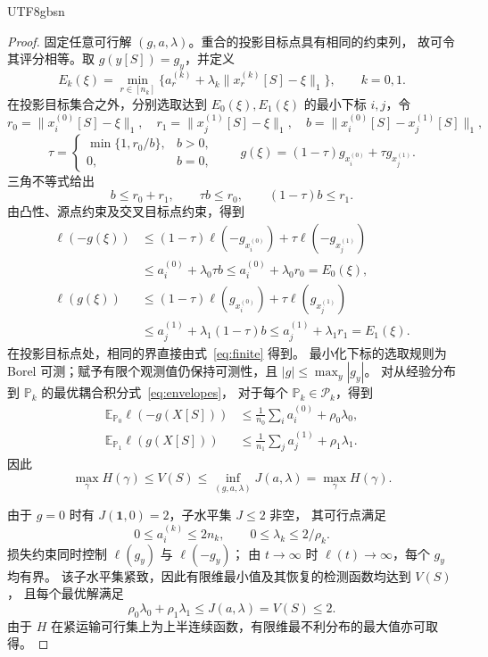 \documentclass[11pt,a4paper]{article}
\theoremstyle{plain}
\begin{document}
\begin{CJK*}{UTF8}{gbsn}
\begin{proof}
固定任意可行解 $(g,a,\lambda)$。重合的投影目标点具有相同的约束列，
故可令其评分相等。取 $g(y[S])=g_y$，并定义
\[
E_k(\xi)=\min_{r\in[n_k]}
\{a_r^{(k)}+\lambda_k\|x_r^{(k)}[S]-\xi\|_1\},
\qquad k=0,1.
\]
在投影目标集合之外，分别选取达到 $E_0(\xi),E_1(\xi)$ 的最小下标
$i,j$，令
\[
r_0=\|x_i^{(0)}[S]-\xi\|_1,\quad
r_1=\|x_j^{(1)}[S]-\xi\|_1,\quad
b=\|x_i^{(0)}[S]-x_j^{(1)}[S]\|_1,
\]
\begin{equation}\label{eq:extension}
\tau=
\begin{cases}
\min\{1,r_0/b\},&b>0,\\
0,&b=0,
\end{cases}
\qquad
g(\xi)=(1-\tau)g_{x_i^{(0)}}+\tau g_{x_j^{(1)}}.
\end{equation}
三角不等式给出
\[
b\le r_0+r_1,\qquad
\tau b\le r_0,\qquad (1-\tau)b\le r_1.
\]
由凸性、源点约束及交叉目标点约束，得到
\begin{equation}\label{eq:envelopes}
\begin{aligned}
\ell(-g(\xi))
&\le(1-\tau)\ell(-g_{x_i^{(0)}})+\tau\ell(-g_{x_j^{(1)}})\\
&\le a_i^{(0)}+\lambda_0\tau b
\le a_i^{(0)}+\lambda_0r_0=E_0(\xi),\\
\ell(g(\xi))
&\le(1-\tau)\ell(g_{x_i^{(0)}})+\tau\ell(g_{x_j^{(1)}})\\
&\le a_j^{(1)}+\lambda_1(1-\tau)b
\le a_j^{(1)}+\lambda_1r_1=E_1(\xi).
\end{aligned}
\end{equation}
在投影目标点处，相同的界直接由式~\eqref{eq:finite} 得到。
最小化下标的选取规则为 Borel 可测；赋予有限个观测值仍保持可测性，且
$|g|\le\max_y|g_y|$。
对从经验分布到 $\mathbb P_k$ 的最优耦合积分式~\eqref{eq:envelopes}，
对于每个 $\mathbb P_k\in\mathcal P_k$，得到
\[
\begin{aligned}
\mathbb E_{\mathbb P_0}\ell(-g(X[S]))
&\le\frac1{n_0}\sum_i a_i^{(0)}+\rho_0\lambda_0,\\
\mathbb E_{\mathbb P_1}\ell(g(X[S]))
&\le\frac1{n_1}\sum_j a_j^{(1)}+\rho_1\lambda_1.
\end{aligned}
\]
因此
\[
\max_\gamma H(\gamma)
\le V(S)
\le\inf_{(g,a,\lambda)}J(a,\lambda)
=\max_\gamma H(\gamma).
\]

由于 $g=0$ 时有 $J(\mathbf1,0)=2$，子水平集 $J\le2$ 非空，
其可行点满足
\[
0\le a_i^{(k)}\le2n_k,\qquad
0\le\lambda_k\le2/\rho_k.
\]
损失约束同时控制 $\ell(g_y)$ 与 $\ell(-g_y)$；
由 $t\to\infty$ 时 $\ell(t)\to\infty$，每个 $g_y$ 均有界。
该子水平集紧致，因此有限维最小值及其恢复的检测函数均达到 $V(S)$，
且每个最优解满足
\begin{equation}\label{eq:uniform-bound}
\rho_0\lambda_0+\rho_1\lambda_1\le J(a,\lambda)=V(S)\le2.
\end{equation}
由于 $H$ 在紧运输可行集上为上半连续函数，有限维最不利分布的最大值亦可取得。
\end{proof}


\end{CJK*}
\end{document}
